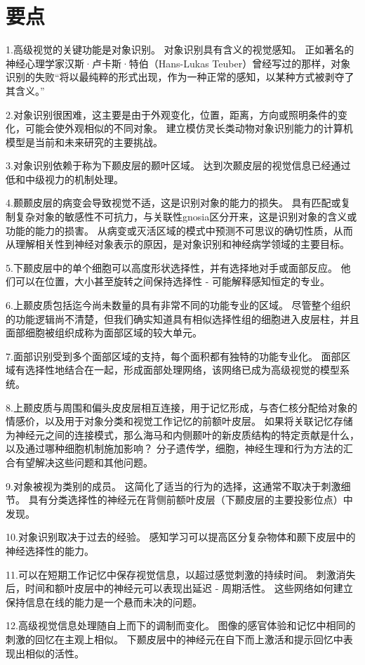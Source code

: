 \section{要点}
1.高级视觉的关键功能是对象识别。
对象识别具有含义的视觉感知。
正如著名的神经心理学家汉斯·卢卡斯·特伯（Hans-Lukas Teuber）曾经写过的那样，对象识别的失败“将以最纯粹的形式出现，作为一种正常的感知，以某种方式被剥夺了其含义。” 


2.对象识别很困难，这主要是由于外观变化，位置，距离，方向或照明条件的变化，可能会使外观相似的不同对象。
建立模仿灵长类动物对象识别能力的计算机模型是当前和未来研究的主要挑战。 


3.对象识别依赖于称为下颞皮层的颞叶区域。
达到次颞皮层的视觉信息已经通过低和中级视力的机制处理。


4.颞颞皮层的病变会导致视觉不适，这是识别对象的能力的损失。
具有匹配或复制复杂对象的敏感性不可抗力，与关联性gnosia区分开来，这是识别对象的含义或功能的能力的损害。
从病变或灭活区域的模式中预测不可思议的确切性质，从而从理解相关性到神经对象表示的原因，是对象识别和神经病学领域的主要目标。 


5.下颞皮层中的单个细胞可以高度形状选择性，并有选择地对手或面部反应。 他们可以在位置，大小甚至旋转之间保持选择性 - 可能解释感知恒定的专业。 


6.上颞皮质包括迄今尚未数量的具有非常不同的功能专业的区域。
尽管整个组织的功能逻辑尚不清楚，但我们确实知道具有相似选择性组的细胞进入皮层柱，并且面部细胞被组织成称为面部区域的较大单元。 


7.面部识别受到多个面部区域的支持，每个面积都有独特的功能专业化。 面部区域有选择性地结合在一起，形成面部处理网络，该网络已成为高级视觉的模型系统。 

8.上颞皮质与周围和偏头皮皮层相互连接，用于记忆形成，与杏仁核分配给对象的情感价，以及用于对象分类和视觉工作记忆的前额叶皮层。 如果将关联记忆存储为神经元之间的连接模式，那么海马和内侧颞叶的新皮质结构的特定贡献是什么，以及通过哪种细胞机制施加影响？ 分子遗传学，细胞，神经生理和行为方法的汇合有望解决这些问题和其他问题。 

9.对象被视为类别的成员。 这简化了适当的行为的选择，这通常不取决于刺激细节。 具有分类选择性的神经元在背侧前额叶皮层（下颞皮层的主要投影位点）中发现。 

10.对象识别取决于过去的经验。 感知学习可以提高区分复杂物体和颞下皮层中的神经选择性的能力。 

11.可以在短期工作记忆中保存视觉信息，以超过感觉刺激的持续时间。 刺激消失后，时间和额叶皮层中的神经元可以表现出延迟 - 周期活性。 这些网络如何建立保持信息在线的能力是一个悬而未决的问题。 

12.高级视觉信息处理随自上而下的调制而变化。 图像的感官体验和记忆中相同的刺激的回忆在主观上相似。 下颞皮层中的神经元在自下而上激活和提示回忆中表现出相似的活性。

